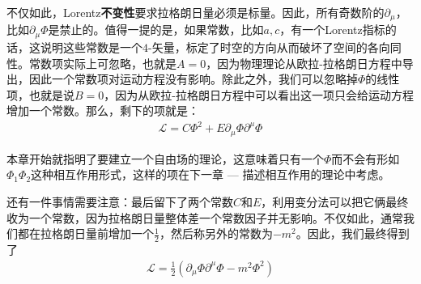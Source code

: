 不仅如此，Lorentz{\bf 不变性}要求拉格朗日量必须是标量。因此，所有奇数阶的$\partial_\mu$，比如$\partial_\mu\Phi$是禁止的。值得一提的是，如果常数，比如$a, c$，有一个Lorentz指标的话，这说明这些常数是一个$4$-矢量，标定了时空的方向从而破坏了空间的各向同性。常数项实际上可忽略，也就是$A=0$，因为物理理论从欧拉-拉格朗日方程中导出，因此一个常数项对运动方程没有影响。除此之外，我们可以忽略掉$\Phi$的线性项，也就是说$B=0$，因为从欧拉-拉格朗日方程中可以看出这一项只会给运动方程增加一个常数。那么，剩下的项就是：
\begin{align}
\label{equ6.3}
\mathscr{L}=C\Phi^2+E\partial_\mu\Phi\partial^\mu\Phi
\end{align}

本章开始就指明了要建立一个自由场的理论，这意味着只有一个$\Phi$而不会有形如$\Phi_1\Phi_2$这种相互作用形式，这样的项在下一章 --- 描述相互作用的理论中考虑。

还有一件事情需要注意：最后留下了两个常数$C$和$E$，利用变分法可以把它俩最终收为一个常数，因为拉格朗日量整体差一个常数因子并无影响。不仅如此，通常我们都在拉格朗日量前增加一个$\frac{1}{2}$，然后称另外的常数为$-m^2$。因此，我们最终得到了
\begin{align}
\label{equ6.4}
\mathscr{L}=\frac{1}{2}(\partial_\mu\Phi\partial^\mu\Phi-m^2\Phi^2)
\end{align}

